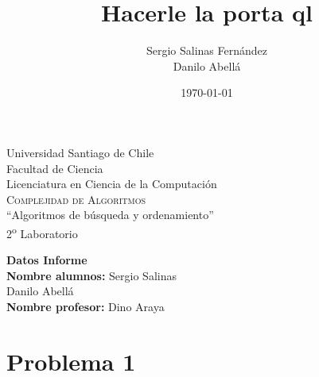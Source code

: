 \documentclass[10pt,letterpaper]{article}
\title{Hacerle la porta ql}								%
\author{Sergio Salinas Fern\'andez \\
Danilo Abellá}								%
\date{\today}											%
\begin{document}
\begin{titlepage}

\begin{center}

{\Large { Universidad Santiago de Chile\\Facultad de Ciencia\\Licenciatura en Ciencia de la Computación
 }}\\[5cm]



{\huge \textsc{Complejidad de Algoritmos}}\\[1.5cm]

{\Huge ``Algoritmos de
búsqueda y ordenamiento'' }\\[1.5cm]


{\LARGE 2\textsuperscript{o} Laboratorio}\\[8cm]

\hspace*{\fill} 
\end{center}
\begin{minipage}[l]{0.4\textwidth}
	\begin{flushleft}
	\linespread{1}
	\end{flushleft}
\end{minipage}
\begin{minipage}[l]{0.6\textwidth}

	\begin{flushright}
		
		\textbf{Datos Informe}\\[0.1cm]
		\large \textbf{Nombre alumnos:} Sergio Salinas\\
		\large Danilo Abellá\\
\large \textbf{Nombre profesor:} Dino Araya\\
	\end{flushright}
\end{minipage}
\end{titlepage}
\newpage
\newpage


\tableofcontents
\pagebreak


\newpage
\section{Problema 1}
\end{document}
